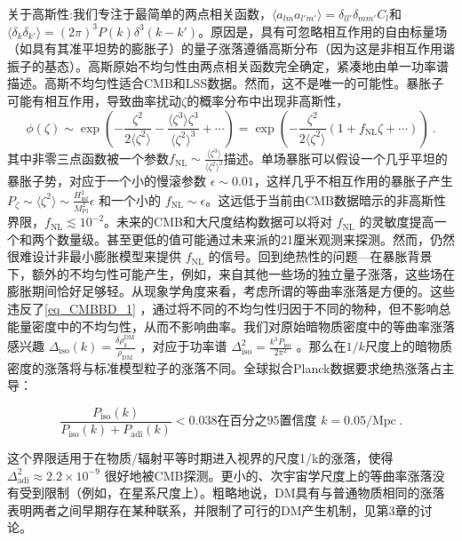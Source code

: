 关于高斯性:我们专注于最简单的两点相关函数，$\langle a_{lm}a_{l'm'}\rangle = \delta_{ll'}\delta_{mm'} C_l$和
$\langle \delta_k \delta_{k'}\rangle = (2\pi)^3 P(k)  \delta^3(k - k')$。原因是，具有可忽略相互作用的自由标量场（如具有其准平坦势的膨胀子）的量子涨落遵循高斯分布（因为这是非相互作用谐振子的基态）。高斯原始不均匀性由两点相关函数完全确定，紧凑地由单一功率谱描述。高斯不均匀性适合CMB和LSS数据。然而，这不是唯一的可能性。暴胀子可能有相互作用，导致曲率扰动$\zeta$的概率分布中出现非高斯性，
\begin{equation}
\phi(\zeta) \sim \exp \left( -\frac{\zeta^2}{2\langle\zeta^2\rangle} - \frac{\langle\zeta^3\rangle\zeta^3}{\langle\zeta^2\rangle^3} + \cdots \right) = \exp \left( -\frac{\zeta^2}{2\langle\zeta^2\rangle} (1 + f_{\text{NL}}\zeta + \cdots) \right) ~.
\end{equation}
其中非零三点函数被一个参数\( f_{\text{NL}} \sim \frac{\langle\zeta^3\rangle}{\langle\zeta^2\rangle^2} \)描述。单场暴胀可以假设一个几乎平坦的暴胀子势，对应于一个小的慢滚参数 \( \epsilon \sim 0.01 \)，这样几乎不相互作用的暴胀子产生 \( P_\zeta \sim \langle\zeta^2\rangle \sim \frac{H^2_{\text{inf}}}{M^2_{\text{Pl}}}\epsilon \) 和一个小的 \( f_{\text{NL}} \sim \epsilon \)。这远低于当前由CMB数据暗示的非高斯性界限，\( f_{\text{NL}} \lesssim 10^{-2} \)。未来的CMB和大尺度结构数据可以将对 \( f_{\text{NL}} \) 的灵敏度提高一个和两个数量级。甚至更低的值可能通过未来派的21厘米观测来探测。然而，仍然很难设计非最小膨胀模型来提供 \( f_{\text{NL}} \) 的信号。回到绝热性的问题—在暴胀背景下，额外的不均匀性可能产生，例如，来自其他一些场的独立量子涨落，这些场在膨胀期间恰好足够轻。从现象学角度来看，考虑所谓的等曲率涨落是方便的。这些违反了\autoref{eq_CMBBD_1} ，通过将不同的不均匀性归因于不同的物种，但不影响总能量密度中的不均匀性，从而不影响曲率。我们对原始暗物质密度中的等曲率涨落感兴趣 \( \Delta_{\text{iso}}(k) = \frac{\delta\rho_k^{\text{DM}}}{\rho_{\text{DM}}} \) ，对应于功率谱 \( \Delta^2_{\text{iso}} = \frac{k^3P_{\text{iso}}}{2\pi^2} \) 。那么在$1/k$尺度上的暗物质密度的涨落将与标准模型粒子的涨落不同。全球拟合Planck数据要求绝热涨落占主导：

\[ \frac{P_{\text{iso}}(k)}{P_{\text{iso}}(k) + P_{\text{adi}}(k)} < 0.038 \text{在百分之95置信度 } k = 0.05/\text{Mpc} ~. \]

这个界限适用于在物质/辐射平等时期进入视界的尺度1/k的涨落，使得 \( \Delta^2_{\text{adi}} \approx 2.2 \times 10^{-9} \) 很好地被CMB探测。更小的、次宇宙学尺度上的等曲率涨落没有受到限制（例如，在星系尺度上）。粗略地说，DM具有与普通物质相同的涨落表明两者之间早期存在某种联系，并限制了可行的DM产生机制，见第3章的讨论。

